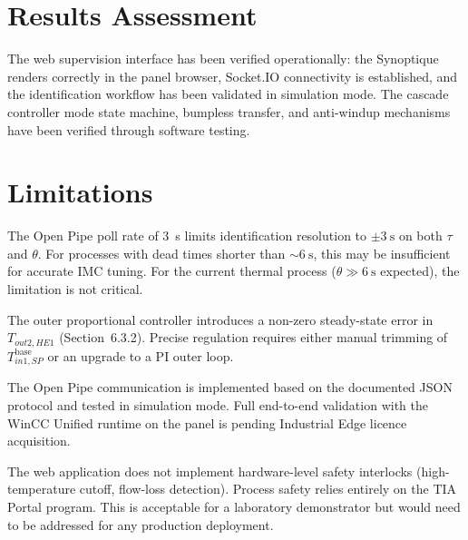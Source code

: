 \section{Results Assessment}


The web supervision interface has been verified operationally: the Synoptique renders
correctly in the panel browser, Socket.IO connectivity is established, and the identification
workflow has been validated in simulation mode. The cascade controller mode state machine,
bumpless transfer, and anti-windup mechanisms have been verified through software testing.

\section{Limitations}
\label{sec:limitations}

\begin{description}[leftmargin=2cm, style=nextline, itemsep=6pt]

  \item[3-second sampling period]
    The Open Pipe poll rate of \SI{3}{\second} limits identification resolution to
    $\pm\SI{3}{\second}$ on both $\tau$ and $\theta$. For processes with dead times
    shorter than $\sim\SI{6}{\second}$, this may be insufficient for accurate IMC tuning.
    For the current thermal process ($\theta \gg \SI{6}{\second}$ expected), the limitation
    is not critical.

  \item[P outer loop offset]
    The outer proportional controller introduces a non-zero steady-state error in
    $T_{out2,HE1}$ (Section~6.3.2). Precise regulation requires either manual trimming of
    $T_{in1,SP}^{\text{base}}$ or an upgrade to a PI outer loop.

  \item[Open Pipe validation]
    The Open Pipe communication is implemented based on the documented JSON protocol and
    tested in simulation mode. Full end-to-end validation with the WinCC Unified runtime
    on the panel is pending Industrial Edge licence acquisition.

  \item[No PLC-side safety interlocks]
    The web application does not implement hardware-level safety interlocks (high-temperature
    cutoff, flow-loss detection). Process safety relies entirely on the TIA Portal program.
    This is acceptable for a laboratory demonstrator but would need to be addressed for
    any production deployment.

\end{description}

